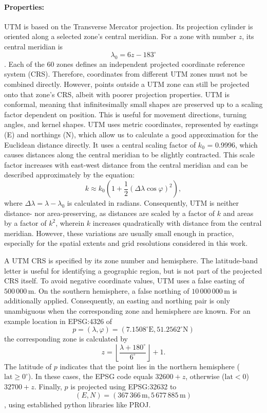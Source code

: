 \paragraph{Properties: } UTM is based on the Transverse Mercator projection. Its projection cylinder is oriented along a selected zone's central meridian. 
For a zone with number $z$, its central meridian is 
\[\lambda_0 = 6z - 183^\circ\].
Each of the 60 zones defines an independent projected coordinate reference system (CRS). Therefore, coordinates from different UTM zones must not be combined directly. 
However, points outside a UTM zone can still be projected onto that zone's CRS, albeit with poorer projection properties. 
UTM is conformal, meaning that infinitesimally small shapes are preserved up to a scaling factor dependent on position. This is useful for movement directions, turning angles, and kernel shapes.
UTM uses metric coordinates, represented by eastings (E) and northings (N), which allow us to calculate a good approximation for the Euclidean distance directly. 
It uses a central scaling factor of $k_0$ = 0.9996, which causes distances along the central meridian to be slightly contracted. 
This scale factor increases with east-west distance from the central meridian and can be described approximately by the equation:
\[
k \approx k_0 \left( 1 + \frac{1}{2}(\Delta \lambda \cos \varphi)^2\right),
\]  
where $\Delta \lambda = \lambda - \lambda_0$ is calculated in radians. Consequently, UTM is neither distance- nor area-preserving, as distances are scaled by a factor of $k$ and areas by 
a factor of $k^2$, wherein $k$ increases quadratically with distance from the central meridian. 
However, these variations are usually small enough in practice, especially for the spatial extents and grid resolutions considered in this work.

A UTM CRS is specified by its zone number and hemisphere. The latitude-band letter is useful for identifying a geographic region, but is not part of the projected CRS itself. 
To avoid negative coordinate values, UTM uses a false easting of \(500\,000\,\mathrm{m}\). 
On the southern hemisphere, a false northing of \(10\,000\,000\,\mathrm{m}\) is additionally applied. 
Consequently, an easting and northing pair is only unambiguous when the corresponding zone and hemisphere are known.
For an example location in EPSG:4326 of 
\[
p = (\lambda, \varphi) = (7.1508^\circ\mathrm{E},51.2562^\circ\mathrm{N})
\]
the corresponding zone is calculated by \[
z
=
\left\lfloor
\frac{\lambda+180^\circ}{6^\circ}
\right\rfloor+1.
\]
The latitude of $p$ indicates that the point lies in the northern hemisphere ($\text{lat} \geq 0^\circ$). 
In these cases, the EPSG code equals $32600 + z$, otherwise ($\text{lat} < 0$) $32700 + z$.
Finally, $p$ is projected using EPSG:32632 to \[
(E,N)
=
(367\,366\,\mathrm{m},5\,677\,885\,\mathrm{m})
\]
, using established python libraries like PROJ.

